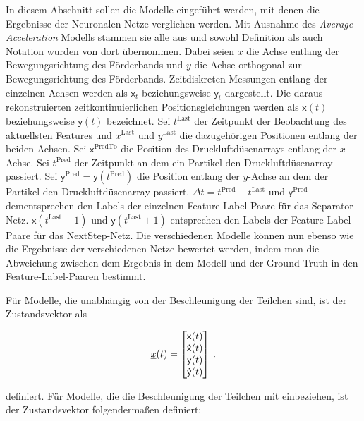 In diesem Abschnitt sollen die Modelle eingeführt werden, mit denen die Ergebnisse der Neuronalen Netze verglichen werden.
Mit Ausnahme des \textit{Average Acceleration} Modells stammen sie alle aus \cite{Pfaff2018} und sowohl Definition als auch Notation wurden von dort übernommen.
Dabei seien \(x\) die Achse entlang der Bewegungsrichtung des Förderbands und \(y\) die Achse orthogonal zur Bewegungsrichtung des Förderbands.
Zeitdiskreten Messungen entlang der einzelnen Achsen werden als \(\mathsf{x}_t\) beziehungsweise \(\mathsf{y}_t\) dargestellt.
Die daraus rekonstruierten zeitkontinuierlichen Positionsgleichungen werden als \(\mathsf{x}(t)\) beziehungsweise \(\mathsf{y}(t)\) bezeichnet.
Sei \(t^{\text{Last}}\) der Zeitpunkt der Beobachtung des aktuellsten Features und \(x^{\text{Last}}\) und \(y^{\text{Last}}\) die dazugehörigen Positionen entlang der beiden Achsen.
Sei \(\mathsf{x}^{\text{PredTo}}\) die Position des Druckluftdüsenarrays entlang der \(x\)-Achse.
Sei \(t^{\text{Pred}}\) der Zeitpunkt an dem ein Partikel den Druckluftdüsenarray passiert.
Sei \(\mathsf{y}^{\text{Pred}} = \mathsf{y}(t^{\text{Pred}})\) die Position entlang der \(y\)-Achse an dem der Partikel den Druckluftdüsenarray passiert.
\(\Delta t = t^{\text{Pred}} - t^{\text{Last}} \) und \(\mathsf{y}^{\text{Pred}}\) dementsprechen den Labels der einzelnen Feature-Label-Paare für das Separator Netz.
\(\mathsf{x}(t^{\text{Last}} + 1)\) und \(\mathsf{y}(t^{\text{Last}} + 1)\) entsprechen den Labels der Feature-Label-Paare für das NextStep-Netz.
Die verschiedenen Modelle können nun ebenso wie die Ergebnisse der verschiedenen Netze bewertet werden, 
indem man die Abweichung zwischen dem Ergebnis in dem Modell und der Ground Truth in den Feature-Label-Paaren bestimmt.


Für Modelle, die unabhängig von der Beschleunigung der Teilchen sind, ist der Zustandsvektor als 

\begin{equation} \label{eq:definitionCV}
    {\underline{x}}(t) = 
    \begin{bmatrix}
        \mathsf{x}(t) \\
        \dot{\mathsf{x}}(t) \\
        \mathsf{y}(t) \\
        \dot{\mathsf{y}}(t)
       \end{bmatrix} \: .
\end{equation}

definiert.
Für Modelle, die die Beschleunigung der Teilchen mit einbeziehen, ist der Zustandsvektor folgendermaßen definiert:

